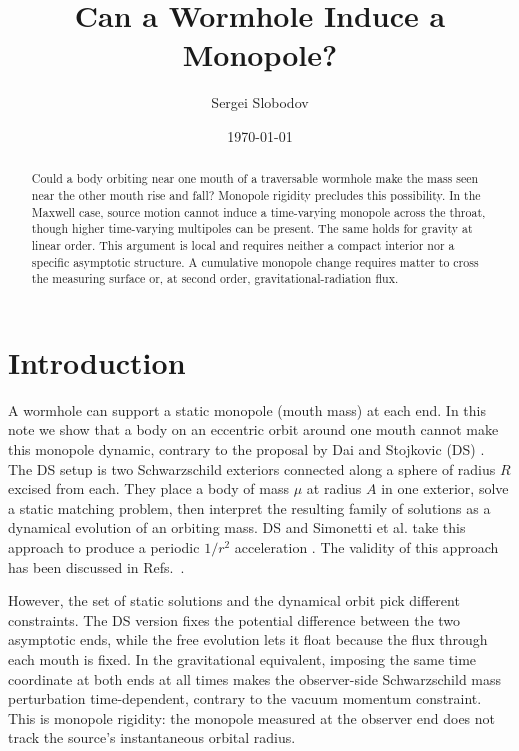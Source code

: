 \documentclass[aps,prd,10pt,onecolumn,nofootinbib,superscriptaddress,floatfix]{revtex4-2}
\begin{document}
\raggedbottom

\title{Can a Wormhole Induce a Monopole?}

\author{Sergei Slobodov}
\noaffiliation

\date{\today}

\begin{abstract}
Could a body orbiting near one mouth of a traversable wormhole make the mass
seen near the other mouth rise and fall?  Monopole rigidity precludes this
possibility.  In the Maxwell case, source motion cannot induce a time-varying
monopole across the throat, though higher time-varying multipoles can be
present.  The same holds for gravity at linear order.  This argument is local
and requires neither a compact interior nor a specific asymptotic structure.
A cumulative monopole change requires matter to cross the measuring surface
or, at second order, gravitational-radiation flux.
\end{abstract}

\maketitle

\section{Introduction}
\label{sec:introduction}

A wormhole can support a static monopole (mouth mass) at each end.  In this note
we show that a body on an eccentric orbit around one mouth cannot make this
monopole dynamic, contrary to the proposal by Dai and Stojkovic (DS)
\cite{DaiStojkovic2019Observing}.  The DS setup is two Schwarzschild exteriors
connected along a sphere of radius $R$ excised from each. They place a body
of mass $\mu$ at radius $A$ in one exterior, solve a static matching problem,
then interpret the resulting family of solutions as a dynamical evolution of
an orbiting mass.  DS and Simonetti et al. take this approach to produce a
periodic $1/r^2$ acceleration \cite{SimonettiEtAl2021SensitiveSearches}.
The validity of this approach has been discussed in
Refs.~\cite{Krasnikov2020CommentObserving,DaiStojkovic2020ReplyObserving}.

However, the set of static solutions and the dynamical orbit pick different
constraints.  The DS version fixes the potential difference between the two 
asymptotic ends, while the free evolution lets it float because the flux 
through each mouth is fixed.  In the gravitational equivalent, imposing the 
same time coordinate at both ends at all times makes the observer-side 
Schwarzschild mass perturbation time-dependent, contrary to the vacuum 
momentum constraint.  This is monopole rigidity: the monopole measured 
at the observer end does not track the source's instantaneous orbital radius.
\end{document}
